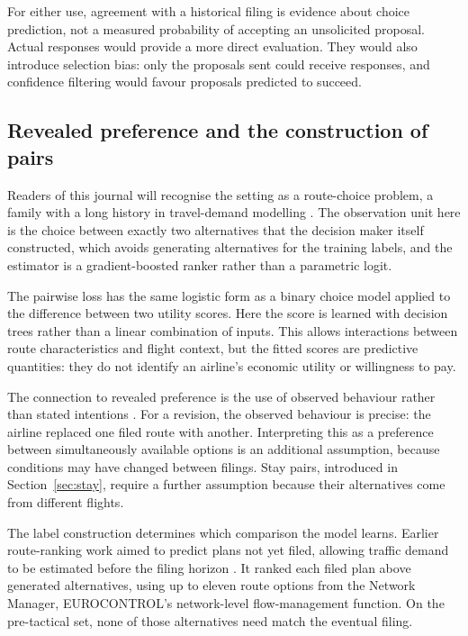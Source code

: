 \documentclass[preprint,authoryear,12pt]{elsarticle}
\begin{document}
For either use, agreement with a historical filing is evidence about
choice prediction, not a measured probability of accepting an unsolicited
proposal. Actual responses would provide a more direct evaluation.
They would also introduce selection bias: only the proposals sent could
receive responses, and confidence filtering would favour proposals predicted to succeed.

\subsection{Revealed preference and the construction of pairs}
\label{sec:pairsvsets}
\label{sec:discrete}

Readers of this journal will recognise the setting as a route-choice
problem, a family with a long history in travel-demand modelling
\citep{mcfadden1974,benakiva1985,train2009}. The observation unit here
is the choice between exactly two alternatives that the decision maker
itself constructed, which avoids generating alternatives for the training labels, and the estimator is a
gradient-boosted ranker rather than a parametric logit.

The pairwise loss has the same logistic form as a binary choice model
applied to the difference between two utility scores. Here the score is
learned with decision trees rather than a linear combination of inputs.
This allows interactions between route characteristics and flight
context, but the fitted scores are predictive quantities: they do not
identify an airline's economic utility or willingness to pay.

The connection to revealed preference is the use of observed behaviour
rather than stated intentions \citep{samuelson1938}. For a revision,
the observed behaviour is precise: the airline replaced one filed route
with another. Interpreting this as a preference between simultaneously
available options is an additional assumption, because conditions may
have changed between filings. Stay pairs, introduced in
Section~\ref{sec:stay}, require a further assumption because their
alternatives come from different flights.

The label construction determines which comparison the model learns.
Earlier route-ranking work aimed to predict plans not yet
filed, allowing traffic demand to be estimated before the filing horizon
\citep{dalmau2024}. It ranked each filed plan above generated alternatives,
using up to eleven route options from the Network Manager, EUROCONTROL's
network-level flow-management function. On the pre-tactical set, none
of those alternatives need match the eventual filing.
\end{document}
